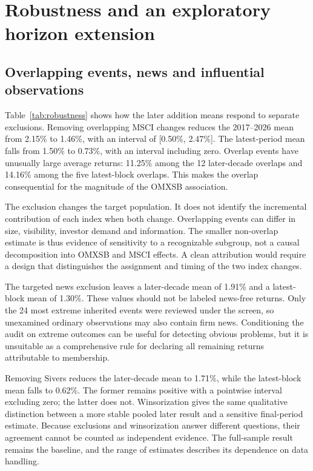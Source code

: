 \section{Robustness and an exploratory horizon extension}
\subsection{Overlapping events, news and influential observations}

Table~\ref{tab:robustness} shows how the later addition means respond to separate exclusions. Removing overlapping MSCI changes reduces the 2017--2026 mean from 2.15\% to 1.46\%, with an interval of [0.50\%, 2.47\%]. The latest-period mean falls from 1.50\% to 0.73\%, with an interval including zero. Overlap events have unusually large average returns: 11.25\% among the 12 later-decade overlaps and 14.16\% among the five latest-block overlaps. This makes the overlap consequential for the magnitude of the OMXSB association.



The exclusion changes the target population. It does not identify the incremental contribution of each index when both change. Overlapping events can differ in size, visibility, investor demand and information. The smaller non-overlap estimate is thus evidence of sensitivity to a recognizable subgroup, not a causal decomposition into OMXSB and MSCI effects. A clean attribution would require a design that distinguishes the assignment and timing of the two index changes.

The targeted news exclusion leaves a later-decade mean of 1.91\% and a latest-block mean of 1.30\%. These values should not be labeled news-free returns. Only the 24 most extreme inherited events were reviewed under the screen, so unexamined ordinary observations may also contain firm news. Conditioning the audit on extreme outcomes can be useful for detecting obvious problems, but it is unsuitable as a comprehensive rule for declaring all remaining returns attributable to membership.

Removing Sivers reduces the later-decade mean to 1.71\%, while the latest-block mean falls to 0.62\%. The former remains positive with a pointwise interval excluding zero; the latter does not. Winsorization gives the same qualitative distinction between a more stable pooled later result and a sensitive final-period estimate. Because exclusions and winsorization answer different questions, their agreement cannot be counted as independent evidence. The full-sample result remains the baseline, and the range of estimates describes its dependence on data handling.

